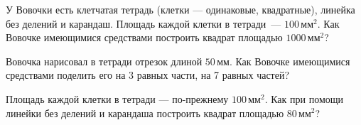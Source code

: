 ﻿
\begin{itemize}

\itA У Вовочки есть клетчатая тетрадь (клетки — одинаковые, квадратные), линейка без делений и карандаш. Площадь каждой клетки в тетради~— $100\,\text{мм}^2$. Как Вовочке имеющимися средствами построить квадрат площадью $1000\,\text{мм}^2$?

\itB Вовочка нарисовал в тетради отрезок длиной $50\,\text{мм}$. Как Вовочке имеющимися средствами поделить его на 3 равных части, на 7 равных частей?

\itC Площадь каждой клетки в тетради — по-прежнему $100\,\text{мм}^2$. Как при помощи линейки без делений и карандаша построить квадрат площадью $80\,\text{мм}^2$?
\end{itemize}